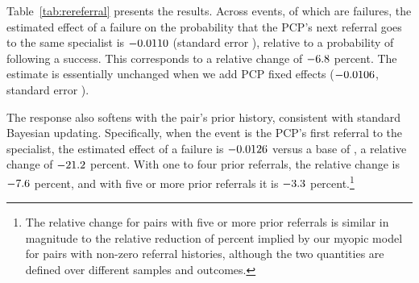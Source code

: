 \documentclass[12pt]{article}
\begin{document}
Table~\ref{tab:rereferral} presents the results. Across \rereferEvents{} events, of which \rereferFailures{} are failures, the estimated effect of a failure on the probability that the PCP's next referral goes to the same specialist is $-0.0110{}$ (standard error \rereferSE{}), relative to a probability of \rereferBase{} following a success. This corresponds to a relative change of $-6.8{}$ percent. The estimate is essentially unchanged when we add PCP fixed effects ($-0.0106{}$, standard error \rereferSEpcp{}).

The response also softens with the pair's prior history, consistent with standard Bayesian updating. Specifically, when the event is the PCP's first referral to the specialist, the estimated effect of a failure is $-0.0126{}$ versus a base of \rereferBasehistzero{}, a relative change of $-21.2{}$ percent. With one to four prior referrals, the relative change is $-7.6{}$ percent, and with five or more prior referrals it is $-3.3{}$ percent.\footnote{The relative change for pairs with five or more prior referrals is similar in magnitude to the relative reduction of \partialFXRelativeMyopic{} percent implied by our myopic model for pairs with non-zero referral histories, although the two quantities are defined over different samples and outcomes.}
\end{document}
